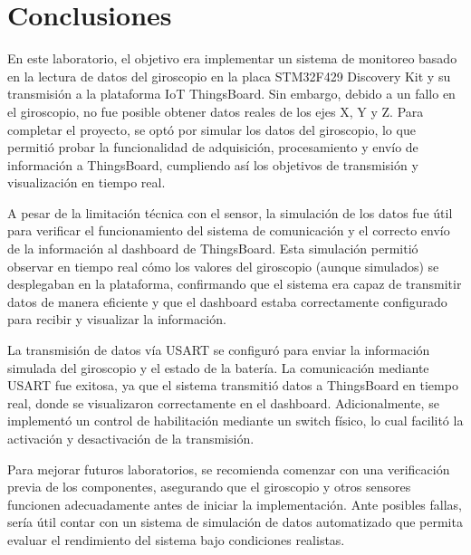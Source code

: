 \section{Conclusiones}
En este laboratorio, el objetivo era implementar un sistema de monitoreo basado en la lectura de datos del giroscopio en la placa STM32F429 Discovery Kit y su transmisión a la plataforma IoT ThingsBoard. Sin embargo, debido a un fallo en el giroscopio, no fue posible obtener datos reales de los ejes X, Y y Z. Para completar el proyecto, se optó por simular los datos del giroscopio, lo que permitió probar la funcionalidad de adquisición, procesamiento y envío de información a ThingsBoard, cumpliendo así los objetivos de transmisión y visualización en tiempo real.

A pesar de la limitación técnica con el sensor, la simulación de los datos fue útil para verificar el funcionamiento del sistema de comunicación y el correcto envío de la información al dashboard de ThingsBoard. Esta simulación permitió observar en tiempo real cómo los valores del giroscopio (aunque simulados) se desplegaban en la plataforma, confirmando que el sistema era capaz de transmitir datos de manera eficiente y que el dashboard estaba correctamente configurado para recibir y visualizar la información.

La transmisión de datos vía USART se configuró para enviar la información simulada del giroscopio y el estado de la batería. La comunicación mediante USART fue exitosa, ya que el sistema transmitió datos a ThingsBoard en tiempo real, donde se visualizaron correctamente en el dashboard. Adicionalmente, se implementó un control de habilitación mediante un switch físico, lo cual facilitó la activación y desactivación de la transmisión. 

Para mejorar futuros laboratorios, se recomienda comenzar con una verificación previa de los componentes, asegurando que el giroscopio y otros sensores funcionen adecuadamente antes de iniciar la implementación. Ante posibles fallas, sería útil contar con un sistema de simulación de datos automatizado que permita evaluar el rendimiento del sistema bajo condiciones realistas.
